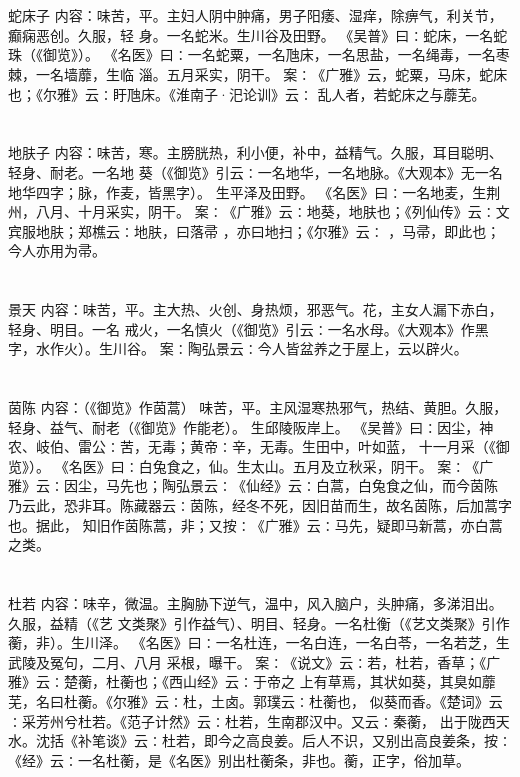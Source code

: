 \documentclass[12pt,UTF8]{ctexbook}
\begin{document}
\section{}蛇床子
内容：味苦，平。主妇人阴中肿痛，男子阳痿、湿痒，除痹气，利关节，癫痫恶创。久服，轻 
身。一名蛇米。生川谷及田野。 
《吴普》曰∶蛇床，一名蛇珠（《御览》）。 
《名医》曰∶一名蛇粟，一名虺床，一名思盐，一名绳毒，一名枣棘，一名墙蘼，生临 
淄。五月采实，阴干。 
案∶《广雅》云，蛇粟，马床，蛇床也；《尔雅》云∶盱虺床。《淮南子·汜论训》云∶ 
乱人者，若蛇床之与蘼芜。 


\section{}地肤子
内容：味苦，寒。主膀胱热，利小便，补中，益精气。久服，耳目聪明、轻身、耐老。一名地 
葵（《御览》引云∶一名地华，一名地脉。《大观本》无一名地华四字；脉，作麦，皆黑字）。 
生平泽及田野。 
《名医》曰∶一名地麦，生荆州，八月、十月采实，阴干。 
案∶《广雅》云∶地葵，地肤也；《列仙传》云∶文宾服地肤；郑樵云∶地肤，曰落帚 
，亦曰地扫；《尔雅》云∶ ，马帚，即此也；今人亦用为帚。 


\section{}景天
内容：味苦，平。主大热、火创、身热烦，邪恶气。花，主女人漏下赤白，轻身、明目。一名 
戒火，一名慎火（《御览》引云∶一名水母。《大观本》作黑字，水作火）。生川谷。 
案∶陶弘景云∶今人皆盆养之于屋上，云以辟火。 


\section{}茵陈
内容：（《御览》作茵蒿） 
味苦，平。主风湿寒热邪气，热结、黄胆。久服，轻身、益气、耐老（《御览》作能老）。 
生邱陵阪岸上。 
《吴普》曰∶因尘，神农、岐伯、雷公∶苦，无毒；黄帝∶辛，无毒。生田中，叶如蓝， 
十一月采（《御览》）。 
《名医》曰∶白兔食之，仙。生太山。五月及立秋采，阴干。 
案∶《广雅》云∶因尘，马先也；陶弘景云∶《仙经》云∶白蒿，白兔食之仙，而今茵陈 
乃云此，恐非耳。陈藏器云∶茵陈，经冬不死，因旧苗而生，故名茵陈，后加蒿字也。据此， 
知旧作茵陈蒿，非；又按∶《广雅》云∶马先，疑即马新蒿，亦白蒿之类。 


\section{}杜若
内容：味辛，微温。主胸胁下逆气，温中，风入脑户，头肿痛，多涕泪出。久服，益精（《艺 
文类聚》引作益气）、明目、轻身。一名杜衡（《艺文类聚》引作蘅，非）。生川泽。 
《名医》曰∶一名杜连，一名白连，一名白苓，一名若芝，生武陵及冤句，二月、八月 
采根，曝干。 
案∶《说文》云∶若，杜若，香草；《广雅》云∶楚蘅，杜蘅也；《西山经》云∶于帝之 
上有草焉，其状如葵，其臭如蘼芜，名曰杜蘅。《尔雅》云∶杜，土卤。郭璞云∶杜蘅也， 
似葵而香。《楚词》云∶采芳州兮杜若。《范子计然》云∶杜若，生南郡汉中。又云∶秦蘅， 
出于陇西天水。沈括《补笔谈》云∶杜若，即今之高良姜。后人不识，又别出高良姜条，按∶ 
《经》云∶一名杜蘅，是《名医》别出杜蘅条，非也。蘅，正字，俗加草。 
\end{document}
